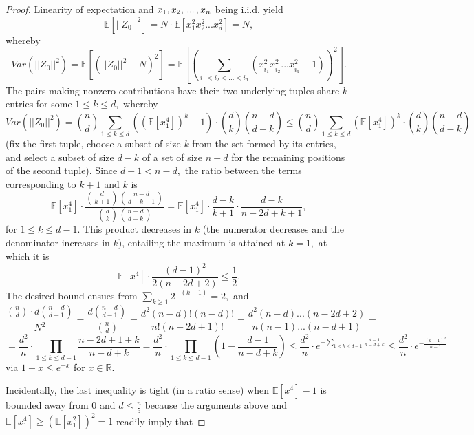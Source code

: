 \documentclass{article}
\numberwithin{equation}{section}
\begin{document}
\begin{proof}
    Linearity of expectation and \(x_1,x_2,\hspace{0.05cm}...\hspace{0.05cm},x_n\) being i.i.d. yield
    \[\mathbb{E}[||Z_0||^2]=N \cdot \mathbb{E}[x_1^2x_2^2...x_d^2]=N,\]
    whereby
    \[Var(||Z_0||^2)=\mathbb{E}[(||Z_0||^2-N)^2]=\mathbb{E}[(\sum_{i_1<i_2<...<i_d}{(x_{i_1}^2x_{i_2}^2...x_{i_d}^2-1)})^2].\]
    The pairs making nonzero contributions have their two underlying tuples share \(k\) entries for some \(1 \leq k \leq d,\) whereby 
    \begin{equation}\label{varcomp}
        Var(||Z_0||^2)=\binom{n}{d}\sum_{1 \leq k \leq d}{((\mathbb{E}[x_1^4])^k-1) \cdot \binom{d}{k} \binom{n-d}{d-k}} \leq \binom{n}{d}\sum_{1 \leq k \leq d}{(\mathbb{E}[x_1^4])^k \cdot \binom{d}{k} \binom{n-d}{d-k}}
    \end{equation}
    (fix the first tuple, choose a subset of size \(k\) from the set formed by its entries, and select a subset of size \(d-k\) of a set of size \(n-d\) for the remaining positions of the second tuple). %
    Since \(d-1<n-d,\) the ratio between the terms corresponding to \(k+1\) and \(k\) is
    \[\mathbb{E}[x_1^4] \cdot \frac{\binom{d}{k+1} \binom{n-d}{d-k-1}}{\binom{d}{k} \binom{n-d}{d-k}}=\mathbb{E}[x_1^4] \cdot \frac{d-k}{k+1} \cdot \frac{d-k}{n-2d+k+1},\]
    for \(1 \leq k \leq d-1.\) This product decreases in \(k\) (the numerator decreases and the denominator increases in \(k\)), %
    entailing the maximum is attained at \(k=1,\) at which it is 
    \[\mathbb{E}[x^4] \cdot \frac{(d-1)^2}{2(n-2d+2)} \leq \frac{1}{2}.\] 
    The desired bound %
    ensues from \(\sum_{k \geq 1}{2^{-(k-1)}}=2,\) and
    \[\frac{\binom{n}{d} \cdot d\binom{n-d}{d-1}}{N^2}=\frac{d\binom{n-d}{d-1}}{\binom{n}{d}}=\frac{d^2(n-d)!(n-d)!}{n!(n-2d+1)!}=\frac{d^2(n-d)...(n-2d+2)}{n(n-1)...(n-d+1)}=\]
    \[=\frac{d^2}{n} \cdot \prod_{1 \leq k \leq d-1}{\frac{n-2d+1+k}{n-d+k}}=\frac{d^2}{n} \cdot \prod_{1 \leq k \leq d-1}{(1-\frac{d-1}{n-d+k})} \leq \frac{d^2}{n} \cdot e^{-\sum_{1 \leq k \leq d-1}{\frac{d-1}{n-d+k}}} \leq \frac{d^2}{n} \cdot e^{-\frac{(d-1)^2}{n-1}}\]
    via \(1-x \leq e^{-x}\) for \(x \in \mathbb{R}.\)
    \vspace{0.3cm}
    \par
    Incidentally, the last inequality is tight (in a ratio sense) when \(\mathbb{E}[x^4]-1\) is bounded away from \(0\) and \(d \leq \frac{n}{5}\) because the arguments above and \(\mathbb{E}[x_1^4] \geq (\mathbb{E}[x_1^2])^2=1\) readily imply that

\end{proof}
\end{document}
